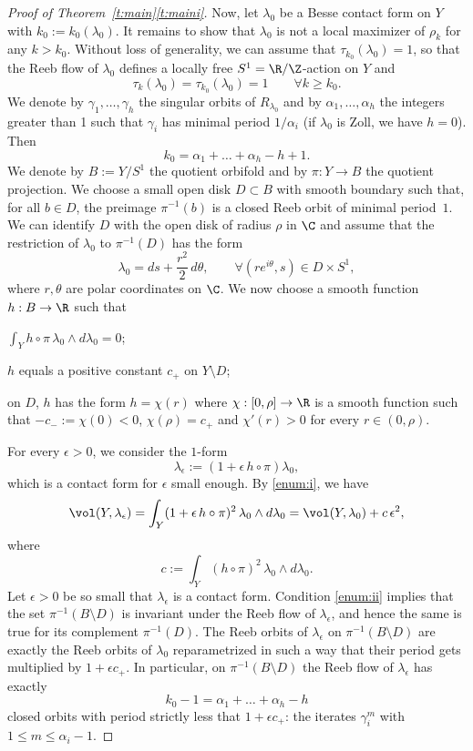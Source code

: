 \begin{proof}[Proof of Theorem~\ref{t:main}\eqref{t:maini}]
Now, let $\lambda_0$ be a Besse contact form on $Y$ with $k_0:=k_0(\lambda_0)$. It remains to show that $\lambda_0$ is not a local maximizer of $\rho_k$ for any $k> k_0$. Without loss of generality, we can assume that $\tau_{k_0}(\lambda_0)=1$, so that the Reeb flow of $\lambda_0$ defines a locally free $S^1=\R/\Z$-action on $Y$ and
\[
\tau_k(\lambda_0) = \tau_{k_0}(\lambda_0) = 1 \qquad \forall k\geq k_0.
\]
We denote by $\gamma_1,\dots,\gamma_h$ the singular orbits of $R_{\lambda_0}$ and by $\alpha_1,\dots,\alpha_h$ the integers greater than 1 such that $\gamma_i$ has minimal period $1/\alpha_i$ (if $\lambda_0$ is Zoll, we have $h=0$). Then
\[
k_0 = \alpha_1 + \dots + \alpha_h - h + 1.
\]
We denote by $B:=Y/S^1$ the quotient orbifold and by $\pi:Y\to B$ the quotient projection. We choose a small open disk $D\subset B$ with smooth boundary such that, for all $b\in D$, the preimage $\pi^{-1}(b)$ is a closed Reeb orbit of minimal period~$1$. We can identify $D$ with the open disk of radius $\rho$ in $\C$ and assume that the restriction of $\lambda_0$ to $\pi^{-1}(D)$ has the form
\begin{equation}
\label{e:form}
\lambda_0 = ds + \frac{r^2}{2}\, d\theta , \qquad \forall (re^{i\theta},s)\in D \times S^1,
\end{equation}
where $r,\theta$ are polar coordinates on $\C$. We now choose a smooth function $h:B \to \R$ such that
\begin{enumeratei}
\item\label{enum:i} $\int_Y h\circ \pi\, \lambda_0 \wedge d\lambda_0=0$;
\item\label{enum:ii} $h$ equals a positive constant $c_+$ on $Y\setminus D$;
\item\label{enum:iii} on $D$, $h$ has the form $h=\chi(r)$ where $\chi:[0,\rho]\to \R$ is a smooth function such that $-c_-:=\chi(0)<0$, $\chi(\rho)=c_+$ and $\chi'(r)>0$ for every $r\in (0,\rho)$.
\end{enumeratei}
For every $\epsilon>0$, we consider the $1$-form
\[
\lambda_{\epsilon}:= (1+\epsilon \,h\circ \pi) \lambda_0,
\]
which is a contact form for $\epsilon$ small enough. By \eqref{enum:i}, we have
\begin{equation}
\label{e:volume_e}
\vol(Y,\lambda_{\epsilon}) = \int_Y (1+\epsilon \,h\circ \pi)^2 \, \lambda_0 \wedge d\lambda_0 = \vol(Y,\lambda_0) + c\, \epsilon^2,
\end{equation}
where
\[
c := \int_Y (h\circ \pi)^2\, \lambda_0 \wedge d\lambda_0.
\]
Let $\epsilon>0$ be so small that $\lambda_{\epsilon}$ is a contact form. Condition \eqref{enum:ii} implies that the set $\pi^{-1}(B\setminus D)$ is invariant under the Reeb flow of $\lambda_{\epsilon}$, and hence the same is true for its complement $\pi^{-1}(D)$. The Reeb orbits of $\lambda_{\epsilon}$ on $\pi^{-1}(B\setminus D)$ are exactly the Reeb orbits of $\lambda_0$ reparametrized in such a way that their period gets multiplied by $1+\epsilon c_+$. In particular, on $\pi^{-1}(B\setminus D)$ the Reeb flow of $\lambda_{\epsilon}$ has exactly
\[
k_0 - 1 = \alpha_1 + \dots + \alpha_h - h
\]
closed orbits with period strictly less that $1+ \epsilon c_+$: the iterates $\gamma_i^m$ with $1\leq m \leq \alpha_i-1$.


\end{proof}
